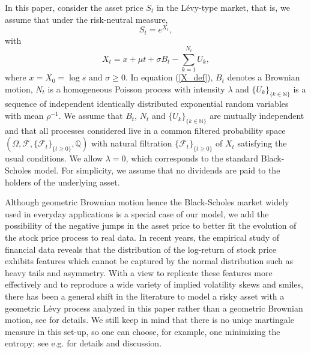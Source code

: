 \documentclass[10pt,a4paper]{amsart}
\def\Q{{\mathbb{Q}}}
\def \F{{\mathcal{F}}}
\begin{document}
	In this paper, consider the asset price $S_t$ in the L\'evy-type market, that is, we assume that under the risk-neutral measure,
	\begin{equation*}
		S_t = e^{X_t},
	\end{equation*}
	with
	\begin{equation}\label{X_def}
		X_t = x + \mu t + \sigma B_t  - \sum_{k=1}^{N_t}U_k, %
	\end{equation}
	where $x = X_0 = \log s$ and $\sigma \geq 0$. In equation (\ref{X_def}), %
	$B_t$ denotes a Brownian motion, $N_t$ is a homogeneous Poisson process with intensity $\lambda$ and $\{U_k\}_{\{k\in \mathbb{N}\}}$ is a sequence of independent identically distributed exponential random variables with mean $\rho^{-1}$.
	We assume that $B_t$, $N_t$ and $\{U_k\}_{\{k\in \mathbb{N}\}}$ are mutually independent and that all processes considered live in a common filtered probability space $(\Omega, \F, \{\mathcal{F}_t\}_{\{t\geq 0\}}, \Q)$
	with natural filtration $\{\F_t\}_{\{t \geq 0\}}$ of $X_t$ satisfying the usual conditions. We allow $\lambda = 0$, which corresponds to the standard Black-Scholes model.
	For simplicity, we assume that no dividends are paid to the holders of the underlying asset.
	
	Although geometric Brownian motion hence the Black-Scholes market widely used in everyday applications is a special case of our model,
we add the possibility of the negative jumps in the asset price to better
fit the evolution of the stock price process to real data.
	In recent years, the empirical study of financial data reveals that the distribution
of the log-return of stock price exhibits features which cannot be captured by the normal
distribution such as heavy tails and asymmetry. With a view to replicate these features
more effectively and to reproduce a wide variety of implied volatility skews and smiles,
there has been a general shift in the literature to model a risky asset with a geometric
	L\'evy process analyzed in this paper rather than a geometric Brownian motion, see \cite{Schoutens} for details.
	We still keep in mind that there is no uniqe martingale measure in this set-up, so one can choose, for example, one minimizing the entropy; see e.g. \cite[Chap. 10.5]{Cont} for details and discussion.
	
\end{document}
